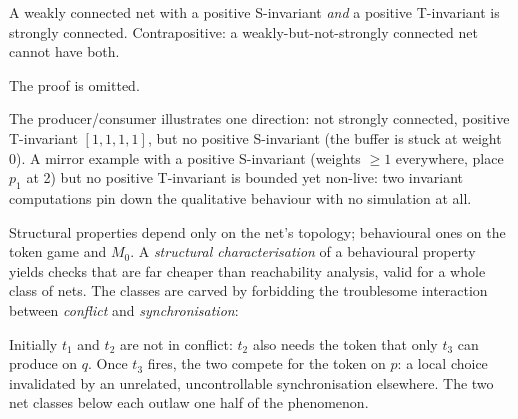 \begin{theorem}
A weakly connected net with a positive S-invariant \emph{and} a positive T-invariant is strongly connected. Contrapositive: a weakly-but-not-strongly connected net cannot have both.
\end{theorem}
The proof is omitted.

The producer/consumer illustrates one direction: not strongly connected, positive T-invariant $[1,1,1,1]$, but no positive S-invariant (the buffer is stuck at weight 0). A mirror example with a positive S-invariant (weights $\geq 1$ everywhere, place $p_1$ at 2) but no positive T-invariant is bounded yet non-live: two invariant computations pin down the qualitative behaviour with no simulation at all.

Structural properties depend only on the net's topology; behavioural ones on the token game and $M_0$. A \emph{structural characterisation} of a behavioural property yields checks that are far cheaper than reachability analysis, valid for a whole class of nets. The classes are carved by forbidding the troublesome interaction between \emph{conflict} and \emph{synchronisation}:
\begin{center}
\end{center}
Initially $t_1$ and $t_2$ are not in conflict: $t_2$ also needs the token that only $t_3$ can produce on $q$. Once $t_3$ fires, the two compete for the token on $p$: a local choice invalidated by an unrelated, uncontrollable synchronisation elsewhere. The two net classes below each outlaw one half of the phenomenon.

